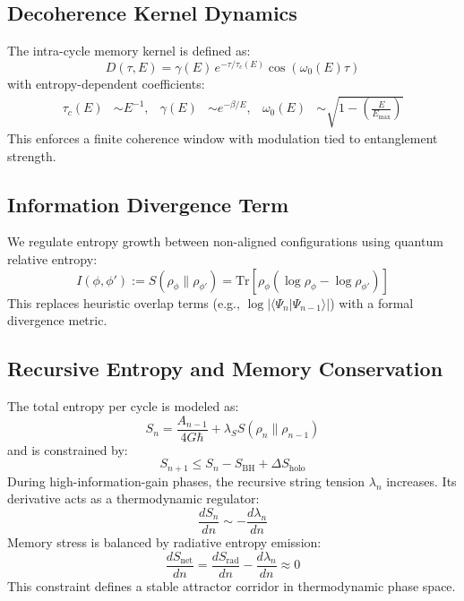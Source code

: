 \subsection{Decoherence Kernel Dynamics}

The intra-cycle memory kernel is defined as:
\begin{equation}
D(\tau, E) = \gamma(E) \, e^{-\tau/\tau_c(E)} \cos(\omega_0(E) \tau)
\end{equation}
with entropy-dependent coefficients:
\begin{align*}
\tau_c(E) &\sim E^{-1}, &
\gamma(E) &\sim e^{-\beta / E}, &
\omega_0(E) &\sim \sqrt{1 - \left( \frac{E}{E_{\text{max}}} \right)}
\end{align*}
This enforces a finite coherence window with modulation tied to entanglement strength.

\subsection{Information Divergence Term}

We regulate entropy growth between non-aligned configurations using quantum relative entropy:
\begin{equation}
I(\phi, \phi') := S(\rho_\phi \| \rho_{\phi'}) = \mathrm{Tr}\left[ \rho_\phi \left( \log \rho_\phi - \log \rho_{\phi'} \right) \right]
\end{equation}
This replaces heuristic overlap terms (e.g., \( \log |\langle \Psi_n | \Psi_{n-1} \rangle| \)) with a formal divergence metric.

\subsection{Recursive Entropy and Memory Conservation}

The total entropy per cycle is modeled as:
\begin{equation}
S_n = \frac{A_{n-1}}{4G\hbar} + \lambda_S S(\rho_n \| \rho_{n-1})
\end{equation}
and is constrained by:
\begin{equation}
S_{n+1} \leq S_n - S_{\text{BH}} + \Delta S_{\text{holo}}
\end{equation}
During high-information-gain phases, the recursive string tension \( \lambda_n \) increases. Its derivative acts as a thermodynamic regulator:
\begin{equation}
\frac{dS_n}{dn} \sim -\frac{d\lambda_n}{dn}
\end{equation}
Memory stress is balanced by radiative entropy emission:
\begin{equation}
\frac{dS_{\text{net}}}{dn} = \frac{dS_{\text{rad}}}{dn} - \frac{d\lambda_n}{dn} \approx 0
\end{equation}
This constraint defines a stable attractor corridor in thermodynamic phase space.

